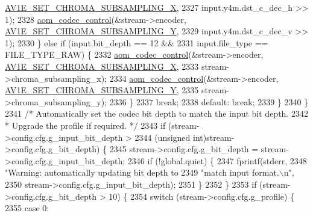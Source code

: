 \begin{DoxyCodeInclude}
{{{{{{{{{{{{{{{{{{{{{{{{{{{{{{{{{{{{{{{{{{{{{{{{{{{{      \hyperlink{group__aom__encoder_ggae78dde67a6d78f332e9bdba0dde42db5a283dd3f4387e5f3a754fea0d206b1cb0}{AV1E\_SET\_CHROMA\_SUBSAMPLING\_X},
2327                                 input.y4m.dst\_c\_dec\_h >> 1);
2328               \hyperlink{group__codec_ga6da974f4eeaba1fa74106b28d0fe6ac5}{aom\_codec\_control}(&stream->encoder, 
      \hyperlink{group__aom__encoder_ggae78dde67a6d78f332e9bdba0dde42db5a501a9453d5790f32c001e9877d3db40c}{AV1E\_SET\_CHROMA\_SUBSAMPLING\_Y},
2329                                 input.y4m.dst\_c\_dec\_v >> 1);
2330             \} \textcolor{keywordflow}{else} \textcolor{keywordflow}{if} (input.bit\_depth == 12 &&
2331                        input.file\_type == FILE\_TYPE\_RAW) \{
2332               \hyperlink{group__codec_ga6da974f4eeaba1fa74106b28d0fe6ac5}{aom\_codec\_control}(&stream->encoder, 
      \hyperlink{group__aom__encoder_ggae78dde67a6d78f332e9bdba0dde42db5a283dd3f4387e5f3a754fea0d206b1cb0}{AV1E\_SET\_CHROMA\_SUBSAMPLING\_X},
2333                                 stream->chroma\_subsampling\_x);
2334               \hyperlink{group__codec_ga6da974f4eeaba1fa74106b28d0fe6ac5}{aom\_codec\_control}(&stream->encoder, 
      \hyperlink{group__aom__encoder_ggae78dde67a6d78f332e9bdba0dde42db5a501a9453d5790f32c001e9877d3db40c}{AV1E\_SET\_CHROMA\_SUBSAMPLING\_Y},
2335                                 stream->chroma\_subsampling\_y);
2336             \}
2337             \textcolor{keywordflow}{break};
2338           \textcolor{keywordflow}{default}: \textcolor{keywordflow}{break};
2339         \}
2340       \}
2341       \textcolor{comment}{/* Automatically set the codec bit depth to match the input bit depth.}
2342 \textcolor{comment}{       * Upgrade the profile if required. */}
2343       \textcolor{keywordflow}{if} (stream->config.cfg.g\_input\_bit\_depth >
2344           (\textcolor{keywordtype}{unsigned} \textcolor{keywordtype}{int})stream->config.cfg.g\_bit\_depth) \{
2345         stream->config.cfg.g\_bit\_depth = stream->config.cfg.g\_input\_bit\_depth;
2346         \textcolor{keywordflow}{if} (!global.quiet) \{
2347           fprintf(stderr,
2348                   \textcolor{stringliteral}{"Warning: automatically updating bit depth to %
2349                   \textcolor{stringliteral}{"match input format.\(\backslash\)n"},
2350                   stream->config.cfg.g\_input\_bit\_depth);
2351         \}
2352       \}
2353       \textcolor{keywordflow}{if} (stream->config.cfg.g\_bit\_depth > 10) \{
2354         \textcolor{keywordflow}{switch} (stream->config.cfg.g\_profile) \{
2355           \textcolor{keywordflow}{case} 0:
}}}}}}}}}}}}}}}}}}}}}}}}}}}}}}}}}}}}}}}}}}}}}}}}}}}}}
\end{DoxyCodeInclude}

